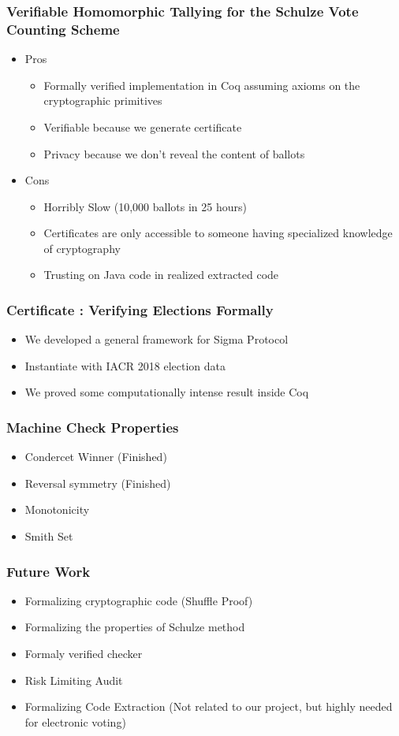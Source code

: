 \documentclass{beamer}
\begin{document}
\begin{frame}
\frametitle{Verifiable Homomorphic Tallying for the Schulze Vote Counting Scheme}
\begin{itemize}[]
\item Pros 
\begin{itemize}
\item Formally verified implementation in Coq assuming axioms on 
          the cryptographic primitives 
\item Verifiable because we generate certificate 
\item Privacy because we don't reveal the content of ballots
\end{itemize}
\item Cons
\begin{itemize}
\item Horribly Slow (10,000 ballots in 25 hours)
\item Certificates are only accessible to someone having specialized 
	  knowledge of cryptography
\item Trusting on Java code in realized extracted code
\end{itemize}
\end{itemize}
\end{frame}


\begin{frame}
\frametitle{Certificate : Verifying Elections Formally}
\begin{itemize}
\item We developed a general framework for Sigma Protocol
\item Instantiate with IACR 2018 election data
\item We proved some computationally intense result inside 
      Coq
\end{itemize}
\end{frame}



\begin{frame}
\frametitle{Machine Check Properties}
\begin{itemize}
\item Condercet Winner (Finished)
\item Reversal symmetry (Finished)
\item Monotonicity
\item Smith Set
\end{itemize}
\end{frame}

\begin{frame}
\frametitle{Future Work}
\begin{itemize}
\item Formalizing cryptographic code (Shuffle Proof)
\item Formalizing the properties of Schulze method
\item Formaly verified checker 
\item Risk Limiting Audit 
\item Formalizing Code Extraction (Not related to our project, but highly needed for electronic voting)
\end{itemize}
\end{frame}
\end{document}
